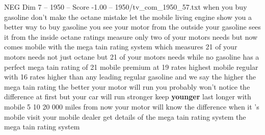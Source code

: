 \begin{textsample}{NEG Dim 7 – 1950 – Score -1.00 – 1950/tv\_com\_1950\_57.txt}  \label{ex:f7_neg_085}
when you buy gasoline don't make the octane mistake let the mobile living engine show you a better way to buy gasoline you see your motor from the outside your gasoline sees it from the inside octane ratings measure only two of your motors needs but now comes mobile with the mega tain rating system which measures 21 of your motors needs not just octane but 21 of your motors needs while no gasoline has a perfect mega tain rating of 21 mobile premium at 19 rates highest mobile regular with 16 rates higher than any leading regular gasoline and we say the higher the mega tain rating the better your motor will run you probably won't notice the difference at first but your car will run stronger keep \textbf{younger} last longer with mobile 5 10 20 000 miles from now your motor will know the difference when it 's mobile visit your mobile dealer get details of the mega tain rating system the mega tain rating system

\end{textsample}
